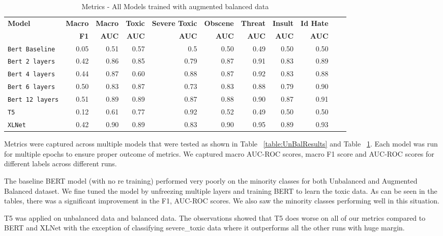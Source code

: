 \documentclass[11pt,a4paper]{article}
\begin{document}
\begin{table}
\centering
\begin{tabular}{lrrrrrrrrrr}
\hline
\textbf{Model} & \textbf{Macro} & \textbf{Macro} & \textbf{Toxic} & \textbf{Severe Toxic} & \textbf{Obscene} & \textbf{Threat} & \textbf{Insult} & \textbf{Id Hate}
\\
\textbf{ } & \textbf{F1} & \textbf{AUC} & \textbf{AUC} & \textbf{AUC} & \textbf{AUC} & \textbf{AUC} & \textbf{AUC} & \textbf{AUC}\\
\hline
\verb|Bert Baseline| & 0.05 & 0.51 & 0.57 & 0.5 & 0.50 & 0.49 & 0.50 & 0.50 \\
\verb|Bert 2 layers| & 0.42 & 0.86 & 0.85 & 0.79 & 0.87 & 0.91 & 0.83 & 0.89 \\
\verb|Bert 4 layers| & 0.44 & 0.87 & 0.60 & 0.88 & 0.87 & 0.92 & 0.83 & 0.88 \\
\verb|Bert 6 layers| & 0.50 & 0.83 & 0.87 & 0.73 & 0.83 & 0.88 & 0.79 & 0.90 \\
\verb|Bert 12 layers| & 0.51 & 0.89 & 0.89 & 0.87 & 0.88 & 0.90 & 0.87 & 0.91 \\
\verb|T5| & 0.12 & 0.61 & 0.77 & 0.92 & 0.52 & 0.49 & 0.50 & 0.50 \\
\verb|XLNet| & 0.42 & 0.90 & 0.89 & 0.83 & 0.90 & 0.95 & 0.89 & 0.93 \\
\hline
\end{tabular}
\caption{Metrics - All Models trained with augmented balanced data}
\label{table:BalResults}
\end{table}

Metrics were captured across multiple models that were tested as shown in Table ~\ref{table:UnBalResults} and Table ~\ref{table:BalResults}. Each model was run for multiple epochs to ensure proper outcome of metrics. We captured macro AUC-ROC scores, macro F1 score and AUC-ROC scores for different labels across different runs.

The baseline BERT model (with no re training) performed very poorly on the minority classes for both Unbalanced and Augmented Balanced dataset. We fine tuned the model by unfreezing multiple layers and training BERT to learn the toxic data. As can be seen in the tables, there was a significant improvement in the F1, AUC-ROC scores. We also saw the minority classes performing well in this situation.

T5 was applied on unbalanced data and balanced data. The observations showed that T5 does worse on all of our metrics compared to BERT and XLNet with the exception of classifying severe\_toxic data where it outperforms all the other runs with huge margin.
\end{document}
